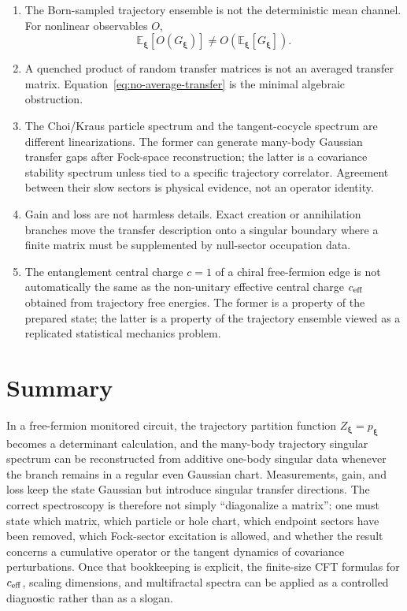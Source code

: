 \documentclass[aps,prb,onecolumn,nofootinbib,superscriptaddress]{revtex4-2}
\newcommand{\E}{\mathbb{E}}
\newcommand{\bxi}{{\boldsymbol{\xi}}}
\theoremstyle{plain}
\theoremstyle{definition}
\begin{document}
\begin{enumerate}
  \item The Born-sampled trajectory ensemble is not the deterministic mean
  channel.  For nonlinear observables \(O\),
  \begin{equation}
    \E_\bxi[O(G_\bxi)]\neq O(\E_\bxi[G_\bxi]).
    \label{eq:nonlinear-average-warning}
  \end{equation}

  \item A quenched product of random transfer matrices is not an averaged
  transfer matrix.  Equation~\eqref{eq:no-average-transfer} is the minimal
  algebraic obstruction.

  \item The Choi/Kraus particle spectrum and the tangent-cocycle spectrum are
  different linearizations.  The former can generate many-body Gaussian
  transfer gaps after Fock-space reconstruction; the latter is a covariance
  stability spectrum unless tied to a specific trajectory correlator.  Agreement
  between their slow sectors is physical evidence, not an operator identity.

  \item Gain and loss are not harmless details.  Exact creation or annihilation
  branches move the transfer description onto a singular boundary where a
  finite matrix must be supplemented by null-sector occupation data.

  \item The entanglement central charge \(c=1\) of a chiral free-fermion edge is
  not automatically the same as the non-unitary effective central charge
  \(c_{\rm eff}\) obtained from trajectory free energies.  The former is a
  property of the prepared state; the latter is a property of the trajectory
  ensemble viewed as a replicated statistical mechanics problem.
\end{enumerate}

\section{Summary}

In a free-fermion monitored circuit, the trajectory partition function
\(Z_\bxi=p_\bxi\) becomes a determinant calculation, and the many-body
trajectory singular spectrum can be reconstructed from additive one-body
singular data whenever the branch remains in a regular even Gaussian chart.
Measurements, gain, and loss keep the state Gaussian but introduce singular
transfer directions.  The correct spectroscopy is therefore not simply
``diagonalize a matrix'': one must state which matrix, which particle or hole
chart, which endpoint sectors have been removed, which Fock-sector excitation
is allowed, and whether the result concerns a cumulative operator or the
tangent dynamics of covariance perturbations.  Once that bookkeeping is
explicit, the finite-size CFT formulas for \(c_{\rm eff}\), scaling dimensions,
and multifractal spectra can be applied as a controlled diagnostic rather than
as a slogan.



\end{document}
